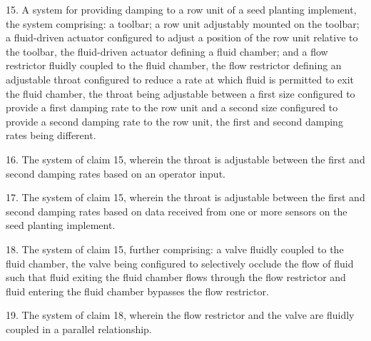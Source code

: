 \documentclass[11pt,a4paper]{article}
\begin{document}
15. A system for providing damping to a row unit of a seed planting implement, the system comprising: a toolbar; a row unit adjustably mounted on the toolbar; a fluid-driven actuator configured to adjust a position of the row unit relative to the toolbar, the fluid-driven actuator defining a fluid chamber; and a flow restrictor fluidly coupled to the fluid chamber, the flow restrictor defining an adjustable throat configured to reduce a rate at which fluid is permitted to exit the fluid chamber, the throat being adjustable between a first size configured to provide a first damping rate to the row unit and a second size configured to provide a second damping rate to the row unit, the first and second damping rates being different.

16. The system of claim 15, wherein the throat is adjustable between the first and second damping rates based on an operator input.

17. The system of claim 15, wherein the throat is adjustable between the first and second damping rates based on data received from one or more sensors on the seed planting implement.

18. The system of claim 15, further comprising: a valve fluidly coupled to the fluid chamber, the valve being configured to selectively occlude the flow of fluid such that fluid exiting the fluid chamber flows through the flow restrictor and fluid entering the fluid chamber bypasses the flow restrictor.

19. The system of claim 18, wherein the flow restrictor and the valve are fluidly coupled in a parallel relationship.
\end{document}

